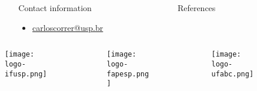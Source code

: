 \documentclass[final, border=3pt]{beamer}
\newlength{\sepmargin}
\newlength{\sepwid}
\newlength{\onecolwid}
\begin{document}
\begin{frame}[t]
\begin{columns}[t]
      \begin{column}{\sepmargin} \end{column}
            \begin{column}{\onecolwid} %
                \begin{block}{\large Contact information}
                    \vspace*{-0.5cm}
					\begin{footnotesize}
					\begin{itemize}
						\item \href{mailto:carloscorrer@usp.br}{carloscorrer@usp.br}
					\end{itemize}
					\end{footnotesize}	
                \end{block}
		    \end{column} %
			\begin{column}{\sepwid}\end{column} %
			\begin{column}{\onecolwid} %
                \begin{block}{\large References}
			        \vspace*{-0.5cm}
              	    \nocite{*} %
					{\footnotesize
						}
				\end{block}
			\end{column} %
			\begin{column}{\sepmargin}\end{column} %
            
\end{columns} %

\begin{columns}
    \begin{column}{8cm}
        \vspace*{-0.9cm}
        \begin{figure}
            \texttt{[image: logo-ifusp.png]}
        \end{figure}
    \end{column}
    \begin{column}{8cm}
        \vspace*{-0.9cm}
        \begin{figure}
            \texttt{[image: logo-fapesp.png]}
        \end{figure}
    \end{column}
    \begin{column}{6cm}
        \vspace*{-0.7cm}
        \begin{figure}
            \texttt{[image: logo-ufabc.png]}
        \end{figure}
    \end{column}
\end{columns}


\end{frame} %
\end{document}
